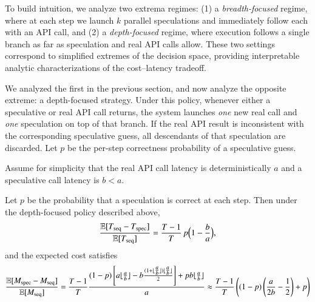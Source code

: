 To build intuition, we analyze two extrema regimes:
(1) a \emph{breadth-focused} regime, where at each step we launch $k$ parallel speculations and immediately follow each with an API call, and  
(2) a \emph{depth-focused} regime, where execution follows a single branch as far as speculation and real API calls allow. These two settings correspond to simplified extremes of the decision space, providing interpretable analytic characterizations of the cost--latency tradeoff.

We analyzed the first in the previous section, and now analyze the opposite extreme: a depth-focused strategy. Under this policy, whenever either a speculative or real API call returns, the system launches \emph{one} new real call and \emph{one} speculation on top of that branch. If the real API result is inconsistent with the corresponding speculative guess, all descendants of that speculation are discarded. Let $p$ be the per-step correctness probability of a speculative guess.

Assume for simplicity that the real API call latency is deterministically $a$ and a speculative call latency is $b<a$.

\begin{theorem}
Let $p$ be the probability that a speculation is correct at each step. Then under the depth-focused policy described above,
\[
    \frac{\mathbb{E}[T_{\mathrm{seq}} - T_{\mathrm{spec}}]}{\mathbb{E}[T_{\mathrm{seq}}]}
    = \frac{T-1}{T} \, p \Bigl(1 - \frac{b}{a}\Bigr),
\]
and the expected cost satisfies
\[
    \frac{\mathbb{E}[M_{\mathrm{spec}} - M_{\mathrm{seq}}]}{\mathbb{E}[M_{\mathrm{seq}}]}
    =
    \frac{T-1}{T}
    \frac{
        (1-p)\left[
            a\lfloor\tfrac{a}{b}\rfloor 
            - b\frac{(1+\lfloor\tfrac{a}{b}\rfloor)\lfloor\tfrac{a}{b}\rfloor}{2}
        \right]
        + p b\lfloor\frac{a}{b}\rfloor
    }{a}\approx\frac{T-1}{T}\left((1-p)\left(\frac{a}{2b}-\frac{1}{2}\right)+p\right)
\]
\label{thm:depth}
\end{theorem}

